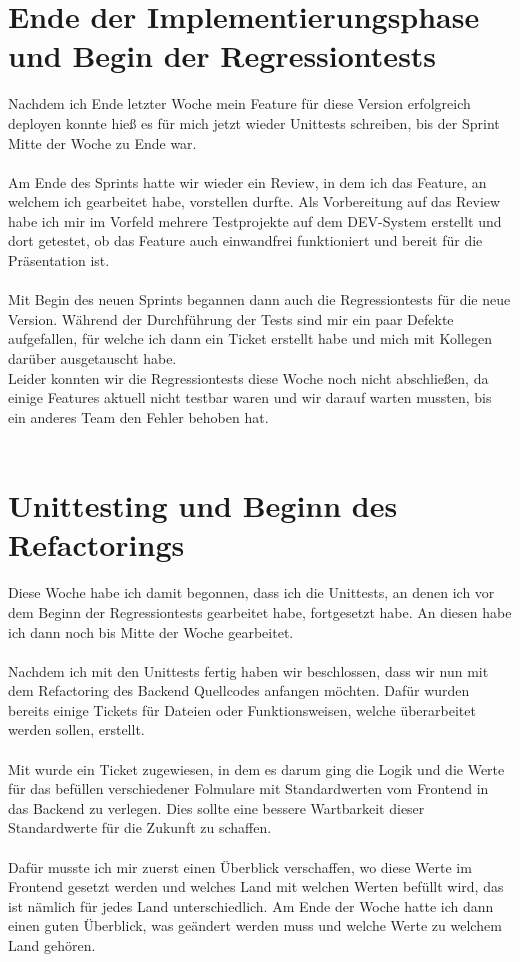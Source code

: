 \section{Ende der Implementierungsphase und Begin der Regressiontests}
Nachdem ich Ende letzter Woche mein Feature für diese Version erfolgreich deployen konnte hieß es für mich jetzt wieder Unittests schreiben, bis der Sprint Mitte der Woche zu Ende war. \\\\
Am Ende des Sprints hatte wir wieder ein Review, in dem ich das Feature, an welchem ich gearbeitet habe, vorstellen durfte. Als Vorbereitung auf das Review habe ich mir im Vorfeld mehrere Testprojekte auf dem DEV-System erstellt und dort getestet, ob das Feature auch einwandfrei funktioniert und bereit für die Präsentation ist. \\\\
Mit Begin des neuen Sprints begannen dann auch die Regressiontests für die neue Version. Während der Durchführung der Tests sind mir ein paar Defekte aufgefallen, für welche ich dann ein Ticket erstellt habe und mich mit Kollegen darüber ausgetauscht habe. \\
Leider konnten wir die Regressiontests diese Woche noch nicht abschließen, da einige Features aktuell nicht testbar waren und wir darauf warten mussten, bis ein anderes Team den Fehler behoben hat. \\\\

\section{Unittesting und Beginn des Refactorings}
Diese Woche habe ich damit begonnen, dass ich die Unittests, an denen ich vor dem Beginn der Regressiontests gearbeitet habe, fortgesetzt habe. An diesen habe ich dann noch bis Mitte der Woche gearbeitet. \\\\
Nachdem ich mit den Unittests fertig haben wir beschlossen, dass wir nun mit dem Refactoring des Backend Quellcodes anfangen möchten. Dafür wurden bereits einige Tickets für Dateien oder Funktionsweisen, welche überarbeitet werden sollen, erstellt. \\\\
Mit wurde ein Ticket zugewiesen, in dem es darum ging die Logik und die Werte für das befüllen verschiedener Folmulare mit Standardwerten vom Frontend in das Backend zu verlegen. Dies sollte eine bessere Wartbarkeit dieser Standardwerte für die Zukunft zu schaffen. \\\\
Dafür musste ich mir zuerst einen Überblick verschaffen, wo diese Werte im Frontend gesetzt werden und welches Land mit welchen Werten befüllt wird, das ist nämlich für jedes Land unterschiedlich. Am Ende der Woche hatte ich dann einen guten Überblick, was geändert werden muss und welche Werte zu welchem Land gehören. \\\\

